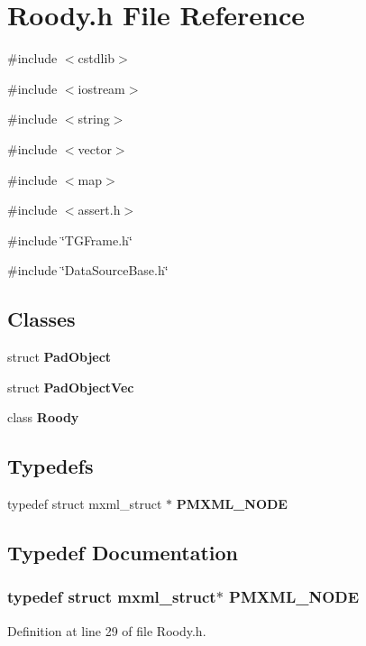 \section{Roody.h File Reference}
\label{Roody_8h}
{\ttfamily \#include $<$cstdlib$>$}\par
{\ttfamily \#include $<$iostream$>$}\par
{\ttfamily \#include $<$string$>$}\par
{\ttfamily \#include $<$vector$>$}\par
{\ttfamily \#include $<$map$>$}\par
{\ttfamily \#include $<$assert.h$>$}\par
{\ttfamily \#include \char`\"{}TGFrame.h\char`\"{}}\par
{\ttfamily \#include \char`\"{}DataSourceBase.h\char`\"{}}\par
\subsection*{Classes}
\begin{DoxyCompactItemize}
\item 
struct {\bf PadObject}
\item 
struct {\bf PadObjectVec}
\item 
class {\bf Roody}
\end{DoxyCompactItemize}
\subsection*{Typedefs}
\begin{DoxyCompactItemize}
\item 
typedef struct mxml\_\-struct $\ast$ {\bf PMXML\_\-NODE}
\end{DoxyCompactItemize}


\subsection{Typedef Documentation}
\subsubsection[{PMXML\_\-NODE}]{\setlength{\rightskip}{0pt plus 5cm}typedef struct mxml\_\-struct$\ast$ {\bf PMXML\_\-NODE}}\label{Roody_8h_ab6cc71ff10d6d49f8d93aee33c3c2810}


Definition at line 29 of file Roody.h.

